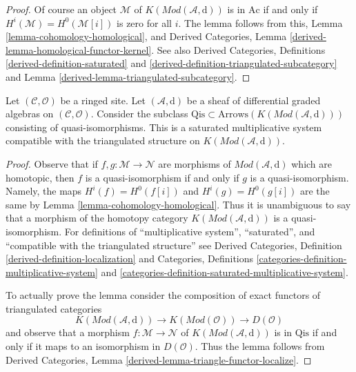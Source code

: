 \begin{proof}
Of course an object $\mathcal{M}$ of $K(\textit{Mod}(\mathcal{A}, \text{d}))$
is in $\text{Ac}$ if and only if $H^i(\mathcal{M}) = H^0(\mathcal{M}[i])$
is zero for all $i$. The lemma follows from this,
Lemma \ref{lemma-cohomology-homological}, and
Derived Categories, Lemma \ref{derived-lemma-homological-functor-kernel}.
See also Derived Categories, Definitions \ref{derived-definition-saturated}
and \ref{derived-definition-triangulated-subcategory} and
Lemma \ref{derived-lemma-triangulated-subcategory}.
\end{proof}

\begin{lemma}
\label{lemma-qis}
Let $(\mathcal{C}, \mathcal{O})$ be a ringed site. Let
$(\mathcal{A}, \text{d})$ be a sheaf of differential graded algebras
on $(\mathcal{C}, \mathcal{O})$.
Consider the subclass
$\text{Qis} \subset \text{Arrows}(K(\textit{Mod}(\mathcal{A}, \text{d})))$
consisting of quasi-isomorphisms. This is a saturated multiplicative
system compatible with the triangulated structure on
$K(\textit{Mod}(\mathcal{A}, \text{d}))$.
\end{lemma}

\begin{proof}
Observe that if $f , g : \mathcal{M} \to \mathcal{N}$ are morphisms
of $\textit{Mod}(\mathcal{A}, \text{d})$ which are homotopic,
then $f$ is a quasi-isomorphism if and only if $g$ is a quasi-isomorphism.
Namely, the maps $H^i(f) = H^0(f[i])$ and $H^i(g) = H^0(g[i])$ are
the same by Lemma \ref{lemma-cohomology-homological}. Thus it is
unambiguous to say that a morphism of the homotopy category
$K(\textit{Mod}(\mathcal{A}, \text{d}))$ is a quasi-isomorphism.
For definitions of ``multiplicative system'', ``saturated'', and
``compatible with the triangulated structure'' see
Derived Categories, Definition \ref{derived-definition-localization}
and
Categories, Definitions \ref{categories-definition-multiplicative-system}
and \ref{categories-definition-saturated-multiplicative-system}.

\medskip\noindent
To actually prove the lemma consider the composition
of exact functors of triangulated categories
$$
K(\textit{Mod}(\mathcal{A}, \text{d}))
\longrightarrow
K(\textit{Mod}(\mathcal{O}))
\longrightarrow
D(\mathcal{O})
$$
and observe that a morphism $f : \mathcal{M} \to \mathcal{N}$
of $K(\textit{Mod}(\mathcal{A}, \text{d}))$ is in $\text{Qis}$
if and only if it maps to an isomorphism in $D(\mathcal{O})$.
Thus the lemma follows from Derived Categories, Lemma
\ref{derived-lemma-triangle-functor-localize}.
\end{proof}

